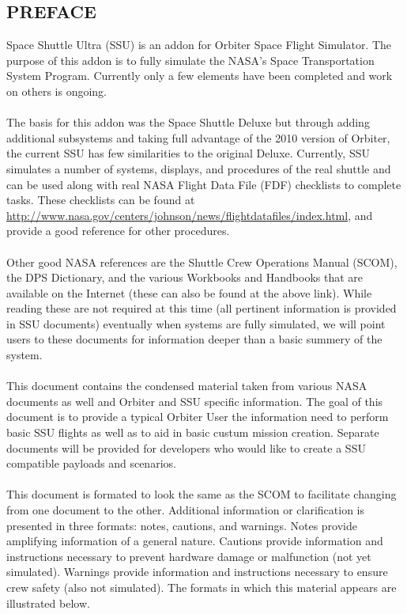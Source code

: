 \documentclass[13pt, letter,final]{article}
\begin{document}
\begin{multicols}{2}
\section*{\large PREFACE}
Space Shuttle Ultra (SSU) is an addon for Orbiter Space Flight Simulator.  The purpose of this addon is to fully simulate the NASA's Space Transportation System Program.  Currently only a few elements have been completed and work on others is ongoing.\\
\\
The basis for this addon was the Space Shuttle Deluxe but through adding additional subsystems and taking full advantage of the 2010 version of Orbiter, the current SSU has few similarities to the original Deluxe.  Currently, SSU simulates a number of systems, displays, and procedures of the real shuttle and can be used along with real NASA Flight Data File (FDF) checklists to complete tasks.  These checklists can be found at \url{http://www.nasa.gov/centers/johnson/news/flightdatafiles/index.html}, and provide a good reference for other procedures.\\
\\
Other good NASA references are the Shuttle Crew Operations Manual (SCOM), the DPS Dictionary, and the various Workbooks and Handbooks that are available on the Internet (these can also be found at the above link).  While reading these are not required at this time (all pertinent information is provided in SSU documents) eventually when systems are fully simulated, we will point users to these documents for information deeper than a basic summery of the system.\\
\\
This document contains the condensed material taken from various NASA documents as well and Orbiter and SSU specific information.  The goal of this document is to provide a typical Orbiter User the information need to perform basic SSU flights as well as  to aid in basic custum mission creation.  Separate documents will be provided for developers who would like to create a SSU compatible payloads and scenarios.\\
\\
This document is formated to look the same as the SCOM to facilitate changing from one document to the other.  Additional information or clarification is presented in three formats: notes, cautions, and warnings. Notes provide amplifying information of a general nature. Cautions provide information and instructions necessary to prevent hardware damage or malfunction (not yet simulated). Warnings provide information and instructions necessary to ensure crew safety (also not simulated). The formats in which this material appears are illustrated below.\\

\end{multicols}
\end{document}

